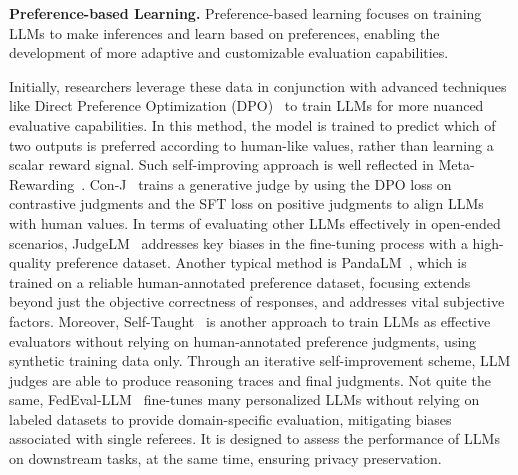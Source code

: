 \textbf{Preference-based Learning.} 
Preference-based learning focuses on training LLMs to make inferences and learn based on preferences, enabling the development of more adaptive and customizable evaluation capabilities.

Initially, researchers leverage these data in conjunction with advanced techniques like Direct Preference Optimization (DPO)~\cite{rafailov2024direct} to train LLMs for more nuanced evaluative capabilities. In this method, the model is trained to predict which of two outputs is preferred according to human-like values, rather than learning a scalar reward signal. Such self-improving approach is well reflected in Meta-Rewarding~\cite{wu2024meta}.
Con-J~\cite{ye2024beyond} trains a generative judge by using the DPO loss on contrastive judgments and the SFT loss on positive judgments to align LLMs with human values.
In terms of evaluating other LLMs effectively in open-ended scenarios, JudgeLM~\cite{zhu2023judgelm} addresses key biases in the fine-tuning process with a high-quality preference dataset.
Another typical method is PandaLM~\cite{wang2023pandalm}, which is trained on a reliable human-annotated preference dataset, focusing extends beyond just the objective correctness of responses, and addresses vital subjective factors.
Moreover, Self-Taught~\cite{wang2024self} is another approach to train LLMs as effective evaluators without relying on human-annotated preference judgments, using synthetic training data only. Through an iterative self-improvement scheme, LLM judges are able to produce reasoning traces and final judgments.
Not quite the same, FedEval-LLM~\cite{he2024fedeval} fine-tunes many personalized LLMs without relying on labeled datasets to provide domain-specific evaluation, mitigating biases associated with single referees. It is designed to assess the performance of LLMs on downstream tasks, at the same time, ensuring privacy preservation.

